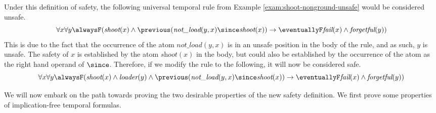\begin{example}
  Under this definition of safety, the following universal temporal
  rule from Example \ref{exam:shoot-nonground-unsafe} would be
  considered unsafe.
\begin{equation*}
  \forall x \forall y \alwaysF( \textit{shoot}(x) \land \previous(\textit{not\_load}(y,x) \since \textit{shoot}(x)) 
  \rightarrow \eventuallyF \textit{fail}(x) \land \textit{forgetful}(y)) 
\end{equation*}
This is due to the fact that the occurrence of the atom
$\textit{not\_load}(y,x)$ is in an unsafe position in the body of the
rule, and as such, $y$ is unsafe. The safety of $x$ is established by
the atom $\textit{shoot}(x)$ in the body, but could also be
established by the occurrence of the atom as the right hand operand of
$\since$. Therefore, if we modify the rule to the following, it will now be considered safe.
\begin{equation*}
  \forall x \forall y \alwaysF( \textit{shoot}(x) \land \textit{loader}(y) \land \previous(\textit{not\_load}(y,x) \since \textit{shoot}(x)) 
  \rightarrow \eventuallyF \textit{fail}(x) \land \textit{forgetful}(y)) 
\end{equation*}
\end{example}

We will now embark on the path towards proving the two desirable
properties of the new safety definition. We first prove some
properties of implication-free temporal formulas.

